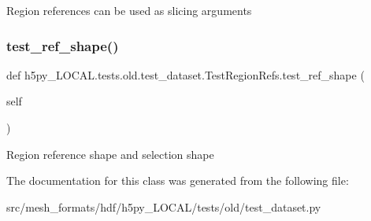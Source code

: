 \begin{DoxyVerb}Region references can be used as slicing arguments \end{DoxyVerb}
 \mbox{\label{classh5py__LOCAL_1_1tests_1_1old_1_1test__dataset_1_1TestRegionRefs_a8d476ade9d6feea1db6b2bf3645bf60d}} 
\subsubsection{\texorpdfstring{test\+\_\+ref\+\_\+shape()}{test\_ref\_shape()}}
{\footnotesize\ttfamily def h5py\+\_\+\+L\+O\+C\+A\+L.\+tests.\+old.\+test\+\_\+dataset.\+Test\+Region\+Refs.\+test\+\_\+ref\+\_\+shape (\begin{DoxyParamCaption}\item[{}]{self }\end{DoxyParamCaption})}

\begin{DoxyVerb}Region reference shape and selection shape \end{DoxyVerb}
 

The documentation for this class was generated from the following file\+:\begin{DoxyCompactItemize}
\item 
src/mesh\+\_\+formats/hdf/h5py\+\_\+\+L\+O\+C\+A\+L/tests/old/test\+\_\+dataset.\+py\end{DoxyCompactItemize}
